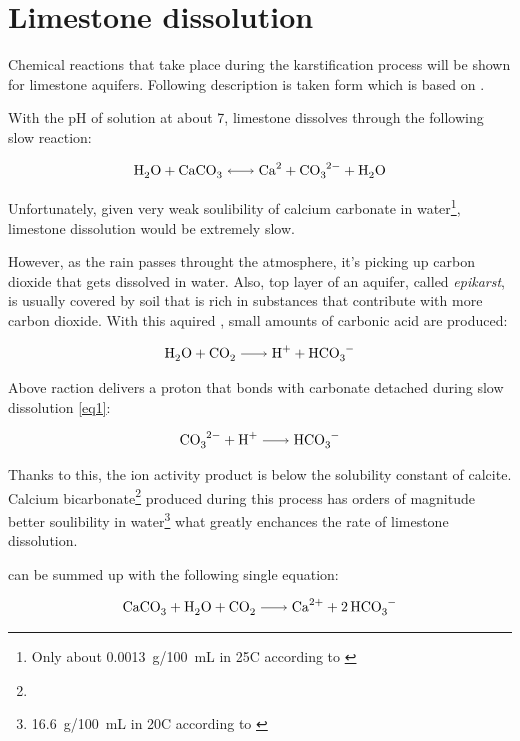 \section{Limestone dissolution}

Chemical reactions that take place during the karstification process will be
shown for limestone aquifers. Following description is taken form \cite{dreybrodt2002}
which is based on \cite{plummer1978}.

With the pH of solution at about 7, limestone dissolves through the following
slow reaction:

\begin{equation}
  \cee{H2O + CaCO3 <-> Ca^2 + CO3^2- + H2O}
  \label{eq1}
\end{equation}

Unfortunately, given very weak soulibility of calcium carbonate in water\footnote{Only about 0.0013~g/100~mL in 25\degree C according to \cite{aylward2008si}},
limestone dissolution would be extremely slow.

However, as the rain passes throught the atmosphere, it's picking up carbon
dioxide that gets dissolved in water. Also, top layer of an aquifer, called
\emph{epikarst}, is usually covered by soil that is rich in substances that
contribute with more carbon dioxide. With this aquired , small amounts
of carbonic acid are produced:

\begin{equation}
  \cee{H2O + CO2 -> H^+ + HCO3^-}
  \label{eq2}
\end{equation}

Above raction delivers a proton that bonds with carbonate detached during slow
dissolution \ref{eq1}:

\begin{equation}
  \ce{CO3^2- + H^+ -> HCO3^-}
  \label{eq3}
\end{equation}

Thanks to this, the ion activity product   is below the
solubility constant of calcite. Calcium bicarbonate\footnote{} produced
during this process has orders of magnitude better soulibility in water\footnote{16.6~g/100~mL in 20\degree C according to \cite{aylward2008si}}
what greatly enchances the rate of limestone dissolution.

 can be summed up with the following single
equation:

\begin{equation}
  \ce{CaCO3 + H2O + CO2 -> Ca^2+ + 2HCO3^- }
  \label{eq4}
\end{equation}

